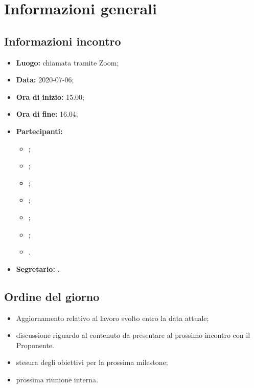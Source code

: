\section{Informazioni generali}
\subsection{Informazioni incontro}
\begin{itemize}
	\item \textbf{Luogo:} chiamata tramite Zoom;
	\item \textbf{Data:} 2020-07-06;
	\item \textbf{Ora di inizio:} 15.00;
	\item \textbf{Ora di fine:} 16.04;
	\item \textbf{Partecipanti:}
		\begin{itemize}
			\item \VB;
			\item \NF;
			\item \EG;
			\item \FJ;
			\item \MP;
			\item \AS;
			\item \AZ.
		\end{itemize}
	\item \textbf{Segretario:} \NF.
\end{itemize}

\subsection{Ordine del giorno}
\begin{itemize}
	\item Aggiornamento relativo al lavoro svolto entro la data attuale;
	\item discussione riguardo al contenuto da presentare al prossimo incontro con il Proponente.
	\item stesura degli obiettivi per la prossima milestone;
	\item prossima riunione interna.
\end{itemize}
